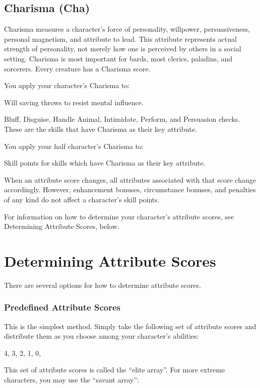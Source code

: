 \subsection{Charisma (Cha)}
Charisma measures a character's force of personality, willpower, persuasiveness, personal magnetism, and attribute to lead. This attribute represents actual strength of personality, not merely how one is perceived by others in a social setting. Charisma is most important for bards, most clerics, paladins, and sorcerers. Every creature has a Charisma score.

You apply your character's Charisma to:
\begin{itemize*}
\item Will saving throws to resist mental influence.
\item Bluff, Disguise, Handle Animal, Intimidate, Perform, and Persuasion checks. These are the skills that have Charisma as their key attribute.
\end{itemize*}
You apply your half character's Charisma to:
\begin{itemize*}
\item Skill points for skills which have Charisma as their key attribute.
\end{itemize*}

When an attribute score changes, all attributes associated with that score change accordingly. However, enhancement bonuses, circumstance bonuses, and penalties of any kind do not affect a character's skill points.

For information on how to determine your character's attribute scores, see Determining Attribute Scores, below.

\section{Determining Attribute Scores}
There are several options for how to determine attribute scores.

\subsubsection{Predefined Attribute Scores}
This is the simplest method. Simply take the following set of attribute scores and distribute them as you choose among your character's abilities:

4, 3, 2, 1, 0, 

This set of attribute scores is called the ``elite array''. For more extreme characters, you may use the ``savant array'':

